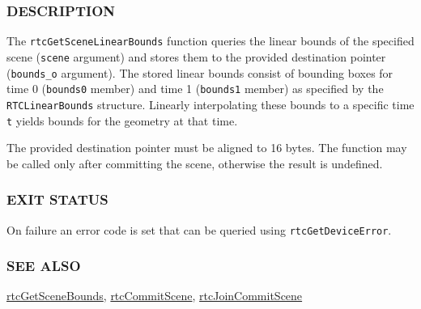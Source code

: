 \begin{Shaded}
\begin{Highlighting}[]

\OperatorTok{(}\OperatorTok{)}
\OperatorTok{\{}
\OperatorTok{;}
\OperatorTok{;}
\OperatorTok{\};}

\OperatorTok{(}
\OperatorTok{,}
  \OperatorTok{*}
\OperatorTok{);}
\end{Highlighting}
\end{Shaded}

\subsubsection{DESCRIPTION}\label{description}

The \texttt{rtcGetSceneLinearBounds} function queries the linear bounds
of the specified scene (\texttt{scene} argument) and stores them to the
provided destination pointer (\texttt{bounds\_o} argument). The stored
linear bounds consist of bounding boxes for time 0 (\texttt{bounds0}
member) and time 1 (\texttt{bounds1} member) as specified by the
\texttt{RTCLinearBounds} structure. Linearly interpolating these bounds
to a specific time \texttt{t} yields bounds for the geometry at that
time.

The provided destination pointer must be aligned to 16 bytes. The
function may be called only after committing the scene, otherwise the
result is undefined.

\subsubsection{EXIT STATUS}\label{exit-status}

On failure an error code is set that can be queried using
\texttt{rtcGetDeviceError}.

\subsubsection{SEE ALSO}\label{see-also}

\hyperref[rtcgetscenebounds]{rtcGetSceneBounds},
\hyperref[rtccommitscene]{rtcCommitScene},
\hyperref[rtcjoincommitscene]{rtcJoinCommitScene}

